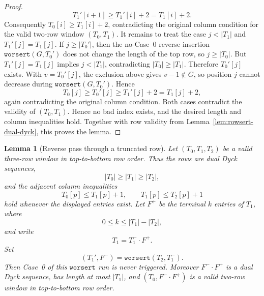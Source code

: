 \documentclass[11pt]{article}
\theoremstyle{plain}
\newtheorem{lemma}[theorem]{Lemma}
\theoremstyle{definition}
\theoremstyle{remark}
\newcommand{\worsert}{\texttt{worsert}}
\begin{document}
\begin{proof}
\[
  T_1'[i+1]\ge T_1'[i]+2=T_1[i]+2.
\]
Consequently \(T_0[i]\ge T_1[i]+2\), contradicting the original column
condition for the valid two-row window \((T_0,T_1)\).
It remains to treat the case \(j<|T_1|\) and \(T_1'[j]=T_1[j]\).  If
\(j\ge |T_0'|\), then the no-Case~0 reverse insertion \(\worsert(G,T_0')\) does
not change the length of the top row, so \(j\ge |T_0|\).  But
\(T_1'[j]=T_1[j]\) implies \(j<|T_1|\), contradicting \(|T_0|\ge |T_1|\).
Therefore \(T_0'[j]\) exists.  With \(v=T_0'[j]\), the exclusion above gives
\(v-1\notin G\), so position \(j\) cannot decrease during
\(\worsert(G,T_0')\).  Hence
\[
  T_0[j]\ge T_0'[j]\ge T_1'[j]+2=T_1[j]+2,
\]
again contradicting the original column condition.
Both cases contradict the validity of \((T_0,T_1)\).  Hence no bad index exists,
and the desired length and column inequalities hold.  Together with row
validity from Lemma~\ref{lem:rowsert-dual-dyck}, this proves the lemma.
\end{proof}


\begin{lemma}[Reverse pass through a truncated row]
\label{lem:reverse-truncated-row-worsert}
Let \((T_0,T_1,T_2)\) be a valid three-row window in top-to-bottom row order.
Thus the rows are dual Dyck sequences,
\[
  |T_0|\ge |T_1|\ge |T_2|,
\]
and the adjacent column inequalities
\[
  T_0[p]\le T_1[p]+1,
  \qquad
  T_1[p]\le T_2[p]+1
\]
hold whenever the displayed entries exist.  Let \(F^+\) be the terminal \(k\)
entries of \(T_1\), where
\[
  0\le k\le |T_1|-|T_2|,
\]
and write
\[
  T_1=T_1^-\cdot F^+.
\]
Set
\[
  (T_1',F^-)=\worsert(T_2,T_1^-).
\]
Then Case~0 of this \(\worsert\) run is never triggered.  Moreover
\(F^-\cdot F^+\) is a dual Dyck sequence, has length at most \(|T_1|\), and
\((T_0,F^-\cdot F^+)\) is a valid two-row window in top-to-bottom row order.
\end{lemma}
\end{document}

